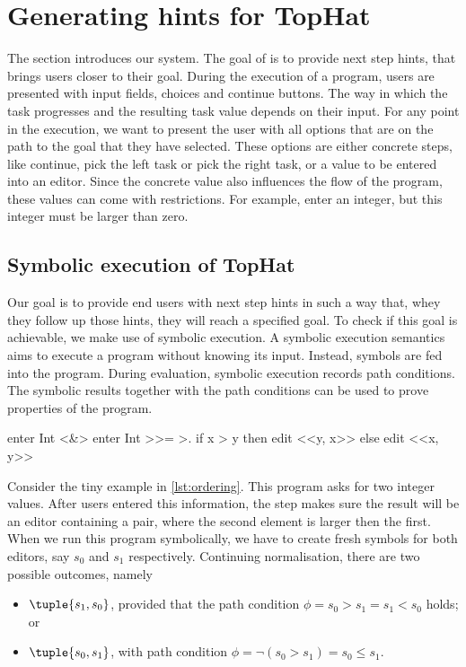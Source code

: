 
\section{Generating hints for TopHat}
\label{sec:assistive}
The section introduces our \ASTOPHAT system.
The goal of \ASTOPHAT is to provide next step hints, that brings users closer to their goal.
During the execution of a \TOPHAT program, users are presented with input fields, choices and continue buttons.
The way in which the task progresses and the resulting task value depends on their input.
For any point in the execution, we want to present the user with all options that are on the path to the goal that they have selected.
These options are either concrete steps, like continue, pick the left task or pick the right task,
or a value to be entered into an editor.
Since the concrete value also influences the flow of the program, these values can come with restrictions.
For example, enter an integer, but this integer must be larger than zero.

\subsection{Symbolic execution of TopHat}
\label{sec:symbolic}

Our goal is to provide end users with next step hints in such a way that, whey they follow up those hints, they will reach a specified goal.
To check if this goal is achievable, we make use of symbolic execution.
A symbolic execution semantics~\cite{King1975,Boyer1975} aims to execute a program without knowing its input.
Instead, symbols are fed into the program.
During evaluation, symbolic execution records path conditions.
The symbolic results together with the path conditions can be used to prove properties of the program.

\begin{TASK}[
    float=ht,
    caption={Ordering of tuple elements.},
    captionpos=b,
    label=lst:ordering]
  enter Int <&> enter Int >>= >. if x > y then edit <<y, x>> else edit <<x, y>>
\end{TASK}

Consider the tiny example in \cref{lst:ordering}.
This program asks for two integer values.
After users entered this information, the step makes sure the result will be an editor containing a pair,
where the second element is larger then the first.
When we run this program symbolically, we have to create fresh symbols for both editors, say $s_0$ and $s_1$ respectively.
Continuing normalisation, there are two possible outcomes, namely
\begin{itemize}
  \item $\tuple{s_1,s_0}$, provided that the path condition $\phi = s_0 > s_1 = s_1 < s_0$ holds; or
  \item $\tuple{s_0,s_1}$, with path condition $\phi = \lnot (s_0 > s_1) = s_0 \leq s_1$.
\end{itemize}

